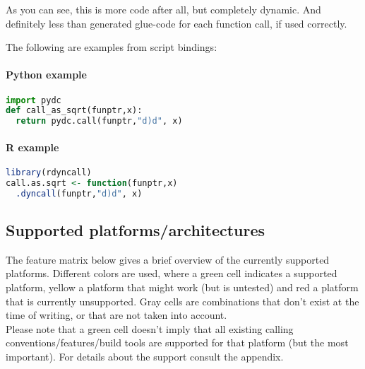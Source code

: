 As you can see, this is more code after all, but completely dynamic.
And definitely less than generated glue-code for each function call, if
used correctly.

The following are examples from script bindings:

\paragraph{Python example}

\begin{lstlisting}[language=python,caption=Dyncall Python bindings example]
import pydc
def call_as_sqrt(funptr,x):
  return pydc.call(funptr,"d)d", x)
\end{lstlisting}


\paragraph{R example}

\begin{lstlisting}[language=R,caption=Dyncall R bindings example]
library(rdyncall)
call.as.sqrt <- function(funptr,x)
  .dyncall(funptr,"d)d", x)
\end{lstlisting}


\pagebreak

\subsection{Supported platforms/architectures}

The feature matrix below gives a brief overview of the currently supported
platforms. Different colors are used, where a green cell indicates a supported
platform, yellow a platform that might work (but is untested) and red a platform
that is currently unsupported. Gray cells are combinations that don't exist
at the time of writing, or that are not taken into account.\\
Please note that a green cell doesn't imply that all existing calling
conventions/features/build tools are supported for that platform (but the most important).
For details about the support consult the appendix.

